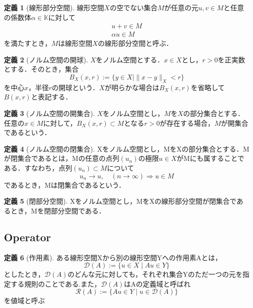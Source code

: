 \documentclass[11pt,a4paper]{jsarticle}
\theoremstyle{definition}
\newtheorem{dfn}{定義}
\begin{document}
\begin{dfn}[線形部分空間]
  線形空間$X$の空でない集合$M$が任意の元$u,v\in M$と任意の係数体$\alpha\in\mathbb{K}$に対して
  \begin{align*}
    u+v\in M \\
    \alpha u \in M
  \end{align*}
  を満たすとき，$M$は線形空間$X$の線形部分空間と呼ぶ．
\end{dfn}

\begin{dfn}[ノルム空間の開球]
  $X$をノルム空間とする．$x\in X$とし，$r>0$を正実数とする．そのとき，集合
  \begin{equation*}
    B_X(x,r):=\{y\in X \mid \|x-y\|_X<r\}
  \end{equation*}
  を中心$x$，半径$r$の開球という．$X$が明らかな場合は$B_X(x,r)$を省略して$B(x,r)$と表記する．
\end{dfn}

\begin{dfn}[ノルム空間の開集合]
  $X$をノルム空間とし，$M$を$X$の部分集合とする．任意の$x\in M$に対して，$B_X(x,r)\subset M$となる$r>0$が存在する場合，$M$が開集合であるという．
\end{dfn}

\begin{dfn}[ノルム空間の閉集合]
  Xをノルム空間とし，MをXの部分集合とする．Mが閉集合であるとは，Mの任意の点列$(u_n)$の極限$u\in X$がMにも属することである．すなわち，点列$(u_n)\subset M$について
  \begin{equation*}
    u_n\rightarrow u, \quad \left(n\rightarrow \infty\right) \Rightarrow u\in M
  \end{equation*}
  であるとき，Mは閉集合であるという．
\end{dfn}

\begin{dfn}[閉部分空間]
  Xをノルム空間とし，MをXの線形部分空間が閉集合であるとき，Mを閉部分空間である．
\end{dfn}

\subsection{Operator}
\begin{dfn}[作用素]
  ある線形空間Xから別の線形空間Yへの作用素Aとは，
  \begin{equation*}
    \mathcal{D}(A) := \{u \in X \mid Au \in Y\}
  \end{equation*}
  としたとき，$\mathcal{D}(A)$のどんな元に対しても，それぞれ集合Yのただ一つの元を指定する規則のことである.また，$\mathcal{D}(A)$はAの定義域と呼ばれ
  \begin{equation*}
    \mathcal{R}(A) := \{Au \in Y \mid u\in\mathcal{D}(A)\}
  \end{equation*}
  を値域と呼ぶ
\end{dfn}
\end{document}
